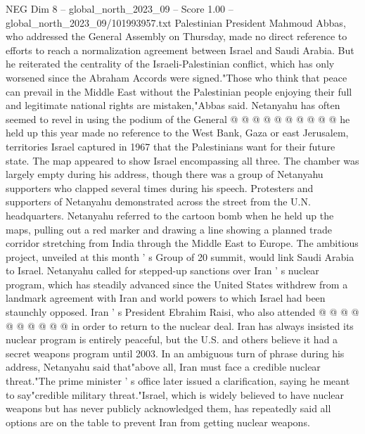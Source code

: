 \begin{textsample}{NEG Dim 8 – global\_north\_2023\_09 – Score 1.00 – global\_north\_2023\_09/101993957.txt}
Palestinian President Mahmoud Abbas, who addressed the General Assembly on Thursday, made no direct reference to efforts to reach a normalization agreement between Israel and Saudi Arabia.
But he reiterated the centrality of the Israeli-Palestinian conflict, which has only worsened since the Abraham Accords were signed."Those who think that peace can prevail in the Middle East without the Palestinian people enjoying their full and legitimate national rights are mistaken,"Abbas said.
Netanyahu has often seemed to revel in using the podium of the General @ @ @ @ @ @ @ @ @ @ he held up this year made no reference to the West Bank, Gaza or east Jerusalem, territories Israel captured in 1967 that the Palestinians want for their future state.
The map appeared to show Israel encompassing all three.
The chamber was largely empty during his address, though there was a group of Netanyahu supporters who clapped several times during his speech.
Protesters and supporters of Netanyahu demonstrated across the street from the U.N. headquarters.
Netanyahu referred to the cartoon bomb when he held up the maps, pulling out a red marker and drawing a line showing a planned trade corridor stretching from India through the Middle East to Europe.
The ambitious project, unveiled at this month ' s Group of 20 summit, would link Saudi Arabia to Israel.
Netanyahu called for stepped-up sanctions over Iran ' s nuclear program, which has steadily advanced since the United States withdrew from a landmark agreement with Iran and world powers to which Israel had been staunchly opposed.
Iran ' s President Ebrahim Raisi, who also attended @ @ @ @ @ @ @ @ @ @ in order to return to the nuclear deal.
Iran has always insisted its nuclear program is entirely peaceful, but the U.S. and others believe it had a secret weapons program until 2003.
In an ambiguous turn of phrase during his address, Netanyahu said that"above all, Iran must face a credible nuclear threat."The prime minister ' s office later issued a clarification, saying he meant to say"credible military threat."Israel, which is widely believed to have nuclear weapons but has never publicly acknowledged them, has repeatedly said all options are on the table to prevent Iran from getting nuclear weapons.

\end{textsample}
